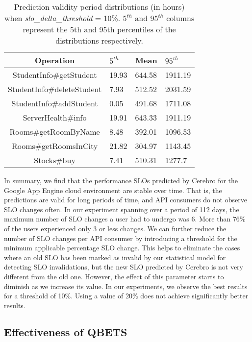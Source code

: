 \begin{table}
\begin{center}
\begin{tabular}{|c|p{2cm}|p{2cm}|p{2cm}|}
\hline
Operation & $5^{th}$ & Mean & $95^{th}$ \\ \hline
StudentInfo\#getStudent & 19.93 & 644.58 & 1911.19 \\ \hline
StudentInfo\#deleteStudent & 7.93 & 512.52 & 2031.59 \\ \hline
StudentInfo\#addStudent & 0.05 & 491.68 & 1711.08 \\ \hline
ServerHealth\#info & 19.91 & 643.33 & 1911.19 \\ \hline
Rooms\#getRoomByName & 8.48 & 392.01 & 1096.53 \\ \hline
Rooms\#getRoomsInCity & 21.82 & 304.97 & 1143.45 \\ \hline
Stocks\#buy & 7.41 & 510.31 & 1277.7 \\ \hline
\end{tabular}
\end{center}
\caption{Prediction validity period distributions (in hours)
when \textit{slo\_delta\_threshold} = 10\%. $5^{th}$ and $95^{th}$ 
columns represent the 5th and 95th percentiles of the
distributions respectively. 
\label{tab:validity_periods_sd10}
}
\end{table}

In summary, we find that the performance SLOs predicted by Cerebro 
for the Google App Engine cloud environment are stable over time. That is, the predictions are 
valid for long periods of time, and API consumers do not observe SLO changes
often. In our experiment spanning over a period of 112
days, the maximum number of SLO changes a user had to undergo was 6. More than 76\% of
the users experienced only 3 or less changes. We can further reduce the number of 
SLO changes per API consumer by introducing a threshold for the minimum applicable
percentage SLO change. This helps to eliminate the cases where an old SLO has been marked as invalid
by our statistical model for detecting SLO invalidations, but the new SLO predicted by Cerebro is not
very different from the old one. However, the effect of this parameter starts to diminish as we
increase its value. In our experiments, we observe the best results for a threshold of
10\%. Using a value of 20\% does not achieve significantly better results.

\subsection{Effectiveness of QBETS}
\label{sec:learning}

